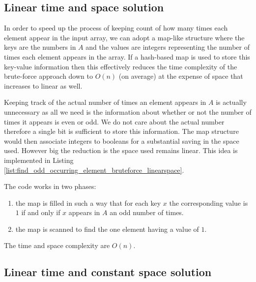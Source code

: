 \subsection{Linear time and space solution}
\label{find_odd_occurring_element:sec:map}

In order to speed up the process of keeping count of how many times each element appear in the input array, we can adopt a map-like structure where the keys are the numbers in $A$ and the values are integers representing the number of times each element appears in the array.
If a hash-based map is used to store this key-value information then this effectively reduces the time complexity of the brute-force approach down to $O(n)$ (on average) at the expense of space that increases to linear as well.

Keeping track of the actual number of times an element appears in $A$ is actually unnecessary as all we need is the information about whether or not the number of times it appears is even or odd. We do not care about the actual number  therefore a single bit is sufficient to store this information. The map structure would then associate integers to booleans for a substantial saving in the space used. However big the reduction is the space used remains linear. 
This idea is implemented in Listing \ref{list:find_odd_occurring_element_bruteforce_linearspace}.



The code works in two phases:
\begin{enumerate}
	\item the map  is filled in such a way that for each key $x$ the corresponding value is $1$ if and only if $x$ appears in $A$ an odd number of times.
	\item the map is scanned to find the one element having a value of $1$.
\end{enumerate}
The time and space complexity are $O(n)$.

\subsection{Linear time and constant space solution}
\label{find_odd_occurring_element:sec:constant_space}

